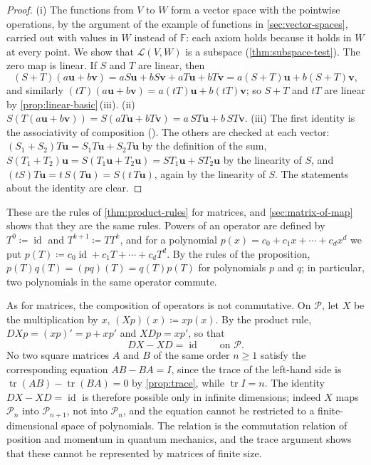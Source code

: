 \begin{proof}
(i) The functions from $V$ to $W$ form a vector space with the pointwise operations, by the argument of the example of functions in \cref{sec:vector-spaces}, carried out with values in $W$ instead of $\mathbb F$: each axiom holds because it holds in $W$ at every point. We show that $\mathcal L(V,W)$ is a subspace (\cref{thm:subspace-test}). The zero map is linear. If $S$ and $T$ are linear, then
\[
(S+T)(a\mathbf u+b\mathbf v)=aS\mathbf u+bS\mathbf v+aT\mathbf u+bT\mathbf v=a(S+T)\mathbf u+b(S+T)\mathbf v,
\]
and similarly $(tT)(a\mathbf u+b\mathbf v)=a(tT)\mathbf u+b(tT)\mathbf v$; so $S+T$ and $tT$ are linear by \cref{prop:linear-basic}\,(iii). (ii) $S(T(a\mathbf u+b\mathbf v))=S(aT\mathbf u+bT\mathbf v)=a\,ST\mathbf u+b\,ST\mathbf v$. (iii) The first identity is the associativity of composition (). The others are checked at each vector: $(S_1+S_2)T\mathbf u=S_1T\mathbf u+S_2T\mathbf u$ by the definition of the sum, $S(T_1+T_2)\mathbf u=S(T_1\mathbf u+T_2\mathbf u)=ST_1\mathbf u+ST_2\mathbf u$ by the linearity of $S$, and $(tS)T\mathbf u=t\,S(T\mathbf u)=S(t\,T\mathbf u)$, again by the linearity of $S$. The statements about the identity are clear.
\end{proof}

These are the rules of \cref{thm:product-rules} for matrices, and \cref{sec:matrix-of-map} shows that they are the same rules. Powers of an operator are defined by $T^0\coloneqq\operatorname{id}$ and $T^{k+1}\coloneqq TT^k$, and for a polynomial $p(x)=c_0+c_1x+\cdots+c_dx^d$ we put $p(T)\coloneqq c_0\operatorname{id}+c_1T+\cdots+c_dT^d$. By the rules of the proposition, $p(T)q(T)=(pq)(T)=q(T)p(T)$ for polynomials $p$ and $q$; in particular, two polynomials in the same operator commute.

As for matrices, the composition of operators is not commutative. On $\mathcal P$, let $X$ be the multiplication by $x$, $(Xp)(x)\coloneqq xp(x)$. By the product rule, $DXp=(xp)'=p+xp'$ and $XDp=xp'$, so that
\[
DX-XD=\operatorname{id}\qquad\text{on }\mathcal P .
\]
No two square matrices $A$ and $B$ of the same order $n\ge1$ satisfy the corresponding equation $AB-BA=I$, since the trace of the left-hand side is $\operatorname{tr}(AB)-\operatorname{tr}(BA)=0$ by \cref{prop:trace}, while $\operatorname{tr}I=n$. The identity $DX-XD=\operatorname{id}$ is therefore possible only in infinite dimensions; indeed $X$ maps $\mathcal P_n$ into $\mathcal P_{n+1}$, not into $\mathcal P_n$, and the equation cannot be restricted to a finite-dimensional space of polynomials. The relation is the commutation relation of position and momentum in quantum mechanics, and the trace argument shows that these cannot be represented by matrices of finite size.

